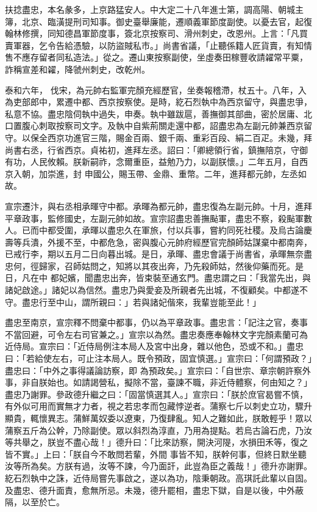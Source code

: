\begin{pinyinscope}
 扶捻盡忠，本名彖多，上京路猛安人。中大定二十八年進士第，調高陽、朝城主簿，北京、臨潢提刑司知事。御史臺舉廉能，遷順義軍節度副使。以憂去官，起復翰林修撰，同知德昌軍節度事，簽北京按察司、滑州刺史，改恩州。上言：「凡買賣軍器，乞令告給憑驗，以防盜賊私市。」尚書省議，「止聽係籍人匠貨賣，有知情售不應存留者同私造法。」從之。遷山東按察副使，坐虛奏田稼豐收請糴常平粟，詐稱宣差和糴，降虢州刺史，改乾州。



 泰和六年，
 伐宋，為元帥右監軍完顏充經歷官，坐奏報稽滯，杖五十。八年，入為吏部郎中，累遷中都、西京按察使。是時，紇石烈執中為西京留守，與盡忠爭，私意不協。盡忠陰伺執中過失，申奏。執中雖跋扈，善撫御其部曲，密於居庸、北口置腹心刺取按察司文字。及執中自紫荊關走還中都，詔盡忠為左副元帥兼西京留守。以保全西京功進官三階，賜金百兩、銀千兩、重彩百段、絹二百疋。未幾，拜尚書右丞，行省西京。貞祐初，進拜左丞。詔曰：「卿總領行省，鎮撫陪京，守御有功，人民攸賴。朕新嗣祚，念爾重臣，益勉乃力，以副朕懷。」二年五月，自西京入朝，加崇進，封
 申國公，賜玉帶、金鼎、重幣。二年，進拜都元帥，左丞如故。



 宣宗遷汴，與右丞相承暉守中都。承暉為都元帥，盡忠復為左副元帥。十月，進拜平章政事，監修國史，左副元帥如故。宣宗詔盡忠善撫颭軍，盡忠不察，殺颭軍數人。已而中都受圍，承暉以盡忠久在軍旅，付以兵事，嘗約同死社稷。及烏古論慶壽等兵潰，外援不至，中都危急，密與腹心元帥府經歷官完顏師姑謀棄中都南奔，已戒行李，期以五月二日向暮出城。是日，承暉、盡忠會議于尚書省，承暉無奈盡忠何，徑歸家，召師姑問之，知將以其夜出奔，乃先殺師姑，然後仰藥而死。是日，凡在中
 都妃嬪，聞盡忠出奔，皆束裝至通玄門。盡忠謂之曰：「我當先出，與諸妃啟途。」諸妃以為信然。盡忠乃與愛妾及所親者先出城，不復顧矣。中都遂不守。盡忠行至中山，謂所親曰：」若與諸妃偕來，我輩豈能至此！」



 盡忠至南京，宣宗釋不問棄中都事，仍以為平章政事。盡忠言：「記注之官，奏事不當回避，可令左右司官兼之。」宣宗以為然。盡忠奏應奉翰林文字完顏素蘭可為近侍局。宣宗曰：「近侍局例注本局人及宮中出身，雜以他色，恐或不和。」盡忠曰：「若給使左右，可止注本局人。既令預政，固宜慎選。」宣宗曰：「何謂預政？」盡忠曰：「中外之事得議論訪察，即
 為預政矣。」宣宗曰：「自世宗、章宗朝許察外事，非自朕始也。如請謁營私，擬除不當，臺諫不職，非近侍體察，何由知之？」盡忠乃謝罪。參政德升繼之曰：「固當慎選其人。」宣宗曰：「朕於庶官曷嘗不慎，有外似可用而實無才力者，視之若忠孝而包藏悖逆者。蒲察七斤以刺史立功，驟升顯貴，輒懷異志。蒲鮮萬奴委以遼東，乃復肆亂。知人之難如此，朕敢輕乎！眾以蒲察五斤為公幹，乃除副使。眾以斜烈為淳直，乃用為提點。若烏古論石虎，乃汝等共舉之，朕豈不盡心哉！」德升曰：「比來訪察，開決河隄，水損田禾等，復之皆不實。」上曰：「朕自今不敢問若輩，外間
 事皆不知，朕幹何事，但終日默坐聽汝等所為矣。方朕有過，汝等不諫，今乃面訐，此豈為臣之義哉！」德升亦謝罪。紇石烈執中之誅，近侍局嘗先事啟之，遂以為功，陰秉朝政。高琪託此輩以自固。及盡忠、德升面責，愈無所忌。未幾，德升罷相，盡忠下獄，自是以後，中外蔽隔，以至於亡。




\end{pinyinscope}
